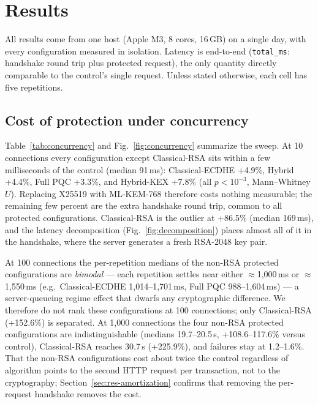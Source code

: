 \section{Results}\label{sec:results}

All results come from one host (Apple M3, 8 cores, 16\,GB) on a single day, with every configuration
measured in isolation. Latency is end-to-end (\texttt{total\_ms}: handshake round trip plus protected
request), the only quantity directly comparable to the control's single request. Unless stated
otherwise, each cell has five repetitions.

\subsection{Cost of protection under concurrency}\label{sec:res-concurrency}
Table~\ref{tab:concurrency} and Fig.~\ref{fig:concurrency} summarize the sweep. At 10 connections
every configuration except Classical-RSA sits within a few milliseconds of the control (median
91\,ms): Classical-ECDHE +4.9\%, Hybrid +4.4\%, Full PQC +3.3\%, and Hybrid-KEX +7.8\% (all
$p<10^{-3}$, Mann--Whitney $U$). Replacing X25519 with ML-KEM-768 therefore costs nothing measurable;
the remaining few percent are the extra handshake round trip, common to all protected
configurations. Classical-RSA is the outlier at +86.5\% (median 169\,ms), and the latency
decomposition (Fig.~\ref{fig:decomposition}) places almost all of it in the handshake, where the
server generates a fresh RSA-2048 key pair.

At 100 connections the per-repetition medians of the non-RSA protected configurations are
\emph{bimodal} --- each repetition settles near either $\approx$1,000\,ms or $\approx$1,550\,ms
(e.g.\ Classical-ECDHE 1,014--1,701\,ms, Full PQC 988--1,604\,ms) --- a server-queueing regime effect
that dwarfs any cryptographic difference. We therefore do not rank these configurations at 100
connections; only Classical-RSA (+152.6\%) is separated. At 1,000 connections the four non-RSA
protected configurations are indistinguishable (medians 19.7--20.5\,s, +108.6--117.6\% versus
control), Classical-RSA reaches 30.7\,s (+225.9\%), and failures stay at 1.2--1.6\%. That the
non-RSA configurations cost about twice the control regardless of algorithm points to the second
HTTP request per transaction, not to the cryptography; Section~\ref{sec:res-amortization} confirms
that removing the per-request handshake removes the cost.

